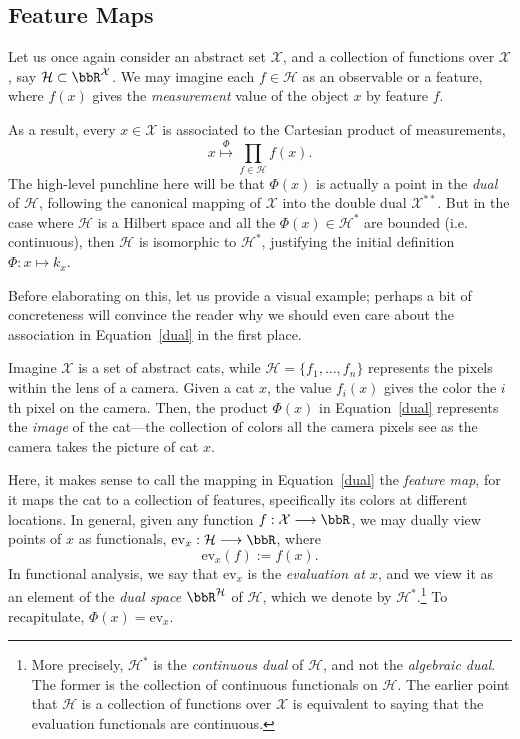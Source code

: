 \documentclass[twoside,11pt]{homework}
\renewcommand{\to}{\longrightarrow}
\begin{document}
\begin{multicols}{2}
\subsection{Feature Maps}
Let us once again consider an abstract set $\mathcal{X}$, and a collection of functions over $\mathcal{X}$, say $\mathcal{H} \subset \bbR^\mathcal{X}$. We may imagine each $f \in \mathcal{H}$ as an observable or a feature, where $f(x)$ gives the \emph{measurement} value of the object $x$ by feature $f$.

As a result, every $x \in \mathcal{X}$ is associated to the Cartesian product of measurements,
\begin{equation}\label{dual}
  x \overset{\Phi}{\mapsto}\prod_{f \in \mathcal{H}} f(x).
\end{equation}
The high-level punchline here will be that $\Phi(x)$ is actually a point in the \emph{dual} of $\mathcal{H}$, following the canonical mapping of $\mathcal{X}$ into the double dual $\mathcal{X}^{**}$. But in the case where $\mathcal{H}$ is a Hilbert space and all the $\Phi(x) \in \mathcal{H}^*$ are bounded (i.e. continuous), then $\mathcal{H}$ is isomorphic to $\mathcal{H}^*$, justifying the initial definition $\Phi : x \mapsto k_x$.

Before elaborating on this, let us provide a visual example; perhaps a bit of concreteness will convince the reader why we should even care about the association in Equation~\ref{dual} in the first place.

Imagine $\mathcal{X}$ is a set of abstract cats, while $\mathcal{H} = \{f_1,\dotsc, f_n\}$ represents the pixels within the lens of a camera. Given a cat $x$, the value $f_i(x)$ gives the color the $i$th pixel on the camera. Then, the product $\Phi(x)$ in Equation~\ref{dual} represents the \emph{image} of the cat---the collection of colors all the camera pixels see as the camera takes the picture of cat $x$.

Here, it makes sense to call the mapping in Equation~\ref{dual} the \emph{feature map}, for it maps the cat to a collection of features, specifically its colors at different locations. In general, given any function $f : \mathcal{X} \to \bbR$, we may dually view points of $x$ as functionals, $\mathrm{ev}_x : \mathcal{H} \to \bbR$, where
\[\mathrm{ev}_x(f) := f(x).\]
In functional analysis, we say that $\mathrm{ev}_x$ is the \emph{evaluation at $x$}, and we view it as an element of the \emph{dual space} $\bbR^\mathcal{H}$ of $\mathcal{H}$, which we denote by $\mathcal{H}^*$.\footnote{More precisely, $\mathcal{H}^*$ is the \emph{continuous dual} of $\mathcal{H}$, and not the \emph{algebraic dual}. The former is the collection of continuous functionals on $\mathcal{H}$. The earlier point that $\mathcal{H}$ is a collection of functions over $\mathcal{X}$ is equivalent to saying that the evaluation functionals are continuous.} To recapitulate, $\Phi(x) = \mathrm{ev}_x$.


\end{multicols}
\end{document}
